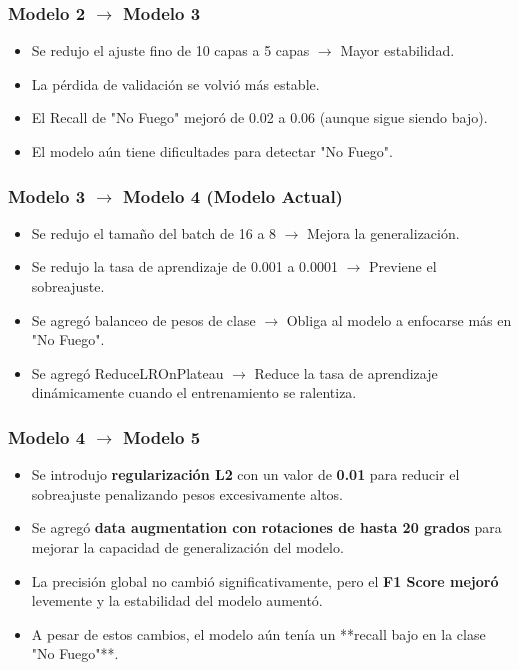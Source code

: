\subsubsection{Modelo 2 $\rightarrow$ Modelo 3}
\begin{itemize}
    \item Se redujo el ajuste fino de 10 capas a 5 capas $\rightarrow$ Mayor estabilidad.
    \item La pérdida de validación se volvió más estable.
    \item El Recall de "No Fuego" mejoró de 0.02 a 0.06 (aunque sigue siendo bajo).
    \item El modelo aún tiene dificultades para detectar "No Fuego".
\end{itemize}

\subsubsection{Modelo 3 $\rightarrow$ Modelo 4 (Modelo Actual)}
\begin{itemize}
    \item Se redujo el tamaño del batch de 16 a 8 $\rightarrow$ Mejora la generalización.
    \item Se redujo la tasa de aprendizaje de 0.001 a 0.0001 $\rightarrow$ Previene el sobreajuste.
    \item Se agregó balanceo de pesos de clase $\rightarrow$ Obliga al modelo a enfocarse más en "No Fuego".
    \item Se agregó ReduceLROnPlateau $\rightarrow$ Reduce la tasa de aprendizaje dinámicamente cuando el entrenamiento se ralentiza.
\end{itemize}

\subsubsection{Modelo 4 $\rightarrow$ Modelo 5}
\begin{itemize}
    \item Se introdujo \textbf{regularización L2} con un valor de \textbf{0.01} para reducir el sobreajuste penalizando pesos excesivamente altos.
    \item Se agregó \textbf{data augmentation con rotaciones de hasta 20 grados} para mejorar la capacidad de generalización del modelo.
    \item La precisión global no cambió significativamente, pero el \textbf{F1 Score mejoró} levemente y la estabilidad del modelo aumentó.
    \item A pesar de estos cambios, el modelo aún tenía un **recall bajo en la clase "No Fuego"**.
\end{itemize}

